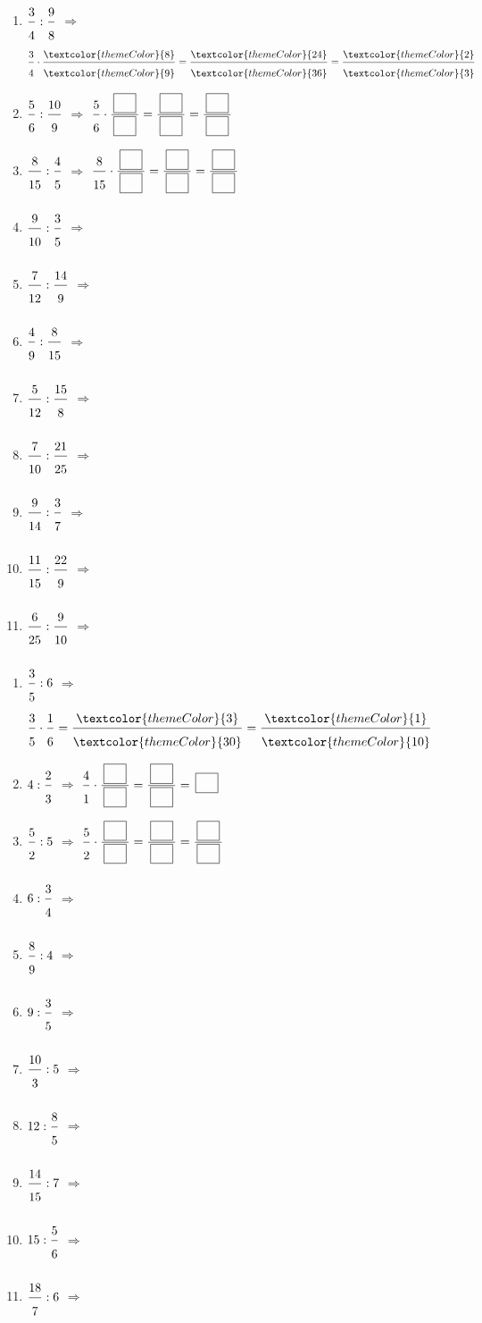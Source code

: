 \begin{enumerate}[leftmargin=*,align=parleft, label=\alph*), itemsep=9pt]
\item $\FA{3}{4}:\FA{9}{8}$ \quad $\Longrightarrow$ \quad $\FA{3}{4}\cdot\FA{\textcolor{themeColor}{8}}{\textcolor{themeColor}{9}}=\FA{\textcolor{themeColor}{24}}{\textcolor{themeColor}{36}}=\FA{\textcolor{themeColor}{2}}{\textcolor{themeColor}{3}}$
\item $\FA{5}{6}:\FA{10}{9}$ \quad $\Longrightarrow$ \quad $\FA{5}{6}\cdot\FA{\CaseC}{\CaseC}=\FA{\CaseC}{\CaseC}=\FA{\CaseC}{\CaseC}$
\item $\FA{8}{15}:\FA{4}{5}$ \quad $\Longrightarrow$ \quad $\FA{8}{15}\cdot\FA{\CaseC}{\CaseC}=\FA{\CaseC}{\CaseC}=\FA{\CaseC}{\CaseC}$
\item $\FA{9}{10}:\FA{3}{5}$ \quad $\Longrightarrow$
\item $\FA{7}{12}:\FA{14}{9}$ \quad $\Longrightarrow$
\item $\FA{4}{9}:\FA{8}{15}$ \quad $\Longrightarrow$
\item $\FA{5}{12}:\FA{15}{8}$ \quad $\Longrightarrow$
\item $\FA{7}{10}:\FA{21}{25}$ \quad $\Longrightarrow$
\item $\FA{9}{14}:\FA{3}{7}$ \quad $\Longrightarrow$
\item $\FA{11}{15}:\FA{22}{9}$ \quad $\Longrightarrow$
\item $\FA{6}{25}:\FA{9}{10}$ \quad $\Longrightarrow$
\end{enumerate}
 
\newpage
{}
 
\begin{enumerate}[leftmargin=*,align=parleft, label=\alph*), itemsep=9pt]
\item $\FA{3}{5}:6$ \quad $\Longrightarrow$ \quad $\FA{3}{5}\cdot\FA{1}{6}=\FA{\textcolor{themeColor}{3}}{\textcolor{themeColor}{30}}=\FA{\textcolor{themeColor}{1}}{\textcolor{themeColor}{10}}$
\item $4:\FA{2}{3}$ \quad $\Longrightarrow$ \quad $\FA{4}{1}\cdot\FA{\CaseC}{\CaseC}=\FA{\CaseC}{\CaseC}=\CaseC$
\item $\FA{5}{2}:5$ \quad $\Longrightarrow$ \quad $\FA{5}{2}\cdot\FA{\CaseC}{\CaseC}=\FA{\CaseC}{\CaseC}=\FA{\CaseC}{\CaseC}$
\item $6:\FA{3}{4}$ \quad $\Longrightarrow$
\item $\FA{8}{9}:4$ \quad $\Longrightarrow$
\item $9:\FA{3}{5}$ \quad $\Longrightarrow$
\item $\FA{10}{3}:5$ \quad $\Longrightarrow$
\item $12:\FA{8}{5}$ \quad $\Longrightarrow$
\item $\FA{14}{15}:7$ \quad $\Longrightarrow$
\item $15:\FA{5}{6}$ \quad $\Longrightarrow$
\item $\FA{18}{7}:6$ \quad $\Longrightarrow$
\end{enumerate}
 
